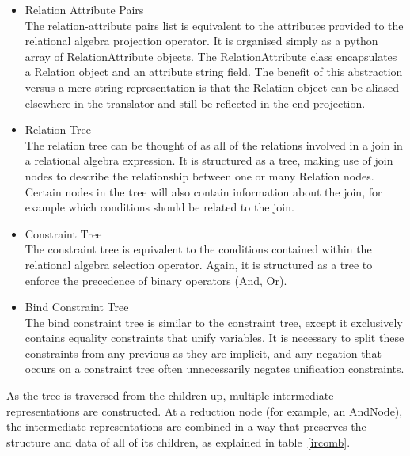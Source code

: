 \documentclass[a4paper, 11pt]{article}
\begin{document}
      \begin{itemize}

          \item Relation Attribute Pairs \\
            The relation-attribute pairs list is equivalent to the attributes
            provided to the relational algebra projection operator. It is
            organised simply as a python array of RelationAttribute objects.
            The RelationAttribute class encapsulates a Relation object and an
            attribute string field. The benefit of this abstraction versus a
            mere string representation is that the Relation object can be
            aliased elsewhere in the translator and still be reflected in the
            end projection.

          \item Relation Tree \\
            The relation tree can be thought of as all of the relations
            involved in a join in a relational algebra expression. It is
            structured as a tree, making use of join nodes to describe the
            relationship between one or many Relation nodes. Certain nodes in
            the tree will also contain information about the join, for example
            which conditions should be related to the join.

          \item Constraint Tree \\
            The constraint tree is equivalent to the conditions contained
            within the relational algebra selection operator. Again, it is
            structured as a tree to enforce the precedence of binary operators
            (And, Or).

          \item Bind Constraint Tree \\
            The bind constraint tree is similar to the constraint tree, except
            it exclusively contains equality constraints that unify variables.
            It is necessary to split these constraints from any previous as
            they are implicit, and any negation that occurs on a constraint
            tree often unnecessarily negates unification constraints.

      \end{itemize}

      As the tree is traversed from the children up, multiple intermediate
      representations are constructed. At a reduction node (for example, an
      AndNode), the intermediate representations are combined in a way that
      preserves the structure and data of all of its children, as explained in
      table~\ref{ircomb}.
\end{document}
